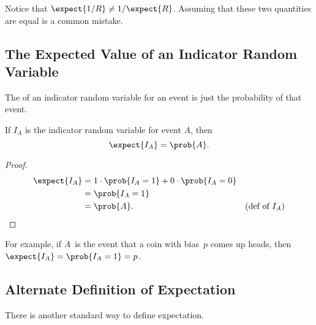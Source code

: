 Notice that $\expect{1/R} \neq 1/\expect{R}$.  Assuming that these
two quantities are equal is a common mistake.

\subsection{The Expected Value of an Indicator Random Variable}

The  of an  indicator random
variable for an event is just the probability of that event.

\begin{lemma}\label{expindic}
If $I_A$ is the indicator random variable for event $A$, then
\[
\expect{I_A} = \prob{A}.
\]
\end{lemma}

\begin{proof}
\begin{align*}
\expect{I_A}
& =  1 \cdot \prob{I_A = 1} + 0 \cdot \prob{I_A = 0} \\
& = \prob{I_A = 1} \\
& =  \prob{A}.\qedhere & \text{(def of $I_A$)}
\end{align*}
\end{proof}
For example, if $A$~is the event that a coin with bias~$p$ comes up
heads, then $\expect{I_A} = \prob{I_A=1} = p$.


\subsection{Alternate Definition of Expectation}

There is another standard way to define expectation.

